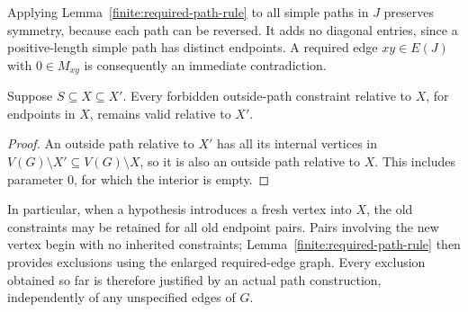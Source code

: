 Applying Lemma~\ref{finite:required-path-rule} to all simple paths in
\(J\) preserves symmetry, because each path can be reversed.
It adds no diagonal entries, since a positive-length simple path has
distinct endpoints.  A required edge \(xy\in E(J)\) with
\(0\in M_{xy}\) is consequently an immediate contradiction.

\begin{lemma}\label{finite:inheritance}
Suppose \(S\subseteq X\subseteq X'\).  Every forbidden outside-path
constraint relative to \(X\), for endpoints in \(X\), remains valid
relative to \(X'\).
\end{lemma}

\begin{proof}
An outside path relative to \(X'\) has all its internal vertices in
\(V(G)\setminus X'\subseteq V(G)\setminus X\), so it is also an outside
path relative to \(X\).  This includes parameter \(0\), for which the
interior is empty.
\end{proof}

In particular, when a hypothesis introduces a fresh vertex into \(X\),
the old constraints may be retained for all old endpoint pairs.
Pairs involving the new vertex begin with no inherited constraints;
Lemma~\ref{finite:required-path-rule} then provides exclusions using
the enlarged required-edge graph.  Every exclusion obtained so far is
therefore justified by an actual path construction, independently of
any unspecified edges of \(G\).
